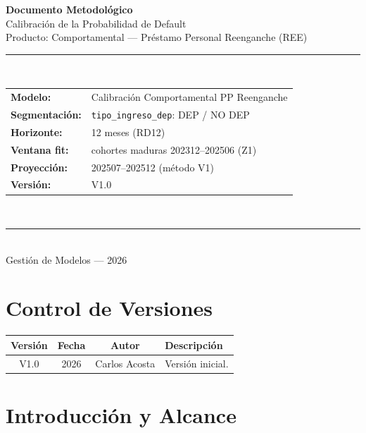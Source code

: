 \documentclass[12pt, a4paper]{article}
\begin{document}
\begin{titlepage}
\centering
\vspace*{3cm}
{\Huge\bfseries\textcolor{azuloscuro}{Documento Metodológico}}\\[0.8cm]
{\LARGE\textcolor{azulclaro}{Calibración de la Probabilidad de Default}}\\[0.5cm]
{\Large\textcolor{azulclaro}{Producto: Comportamental --- Préstamo Personal Reenganche (REE)}}\\[2cm]
\rule{0.8\textwidth}{0.5pt}\\[1cm]
{\large
\begin{tabular}{ll}
\textbf{Modelo:}        & Calibración Comportamental PP Reenganche \\
\textbf{Segmentación:}  & \texttt{tipo\_ingreso\_dep}: DEP / NO DEP \\
\textbf{Horizonte:}     & 12 meses (RD12) \\
\textbf{Ventana fit:}   & cohortes maduras 202312--202506 (Z1) \\
\textbf{Proyección:}    & 202507--202512 (método V1) \\
\textbf{Versión:}       & V1.0 \\
\end{tabular}
}\\[2cm]
\rule{0.8\textwidth}{0.5pt}\\[1cm]
{\large Gestión de Modelos --- 2026}
\vfill
\end{titlepage}

\newpage

\section*{Control de Versiones}
\begin{table}[H]
\centering
\small
\begin{tabular}{cccp{7.5cm}}
\toprule
\textbf{Versión} & \textbf{Fecha} & \textbf{Autor} & \textbf{Descripción} \\
\midrule
V1.0 & 2026 & Carlos Acosta & Versión inicial. \\
\bottomrule
\end{tabular}
\end{table}

\newpage
\tableofcontents
\newpage

\section{Introducción y Alcance}
\end{document}
